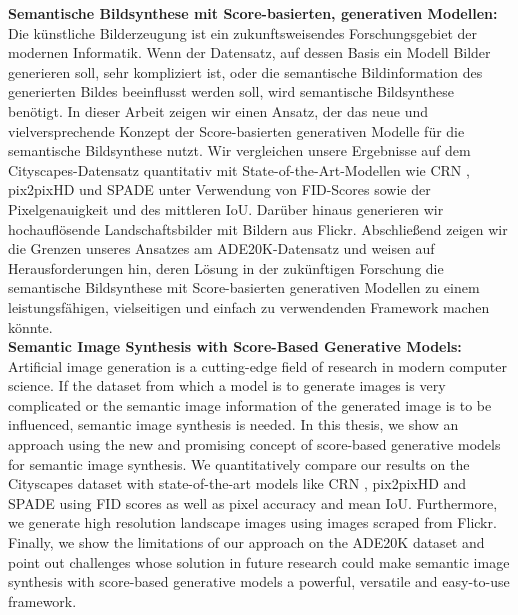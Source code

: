 \noindent\textbf{Semantische Bildsynthese mit Score-basierten, generativen Modellen:}\\[0.3cm]
\noindent Die künstliche Bilderzeugung ist ein zukunftsweisendes Forschungsgebiet der modernen Informatik. Wenn der Datensatz, auf dessen Basis ein Modell Bilder generieren soll, sehr kompliziert ist, oder die semantische Bildinformation des generierten Bildes beeinflusst werden soll, wird semantische Bildsynthese benötigt. In dieser Arbeit zeigen wir einen Ansatz, der das neue und vielversprechende Konzept der Score-basierten generativen Modelle für die semantische Bildsynthese nutzt. Wir vergleichen unsere Ergebnisse auf dem Cityscapes-Datensatz \cite{cityscapes} quantitativ mit State-of-the-Art-Modellen wie CRN \cite{crn}, pix2pixHD \cite{pix2pixHD} und SPADE \cite{spade} unter Verwendung von FID-Scores sowie der Pixelgenauigkeit und des mittleren IoU. Darüber hinaus generieren wir hochauflösende Landschaftsbilder mit Bildern aus Flickr. Abschließend zeigen wir die Grenzen unseres Ansatzes am ADE20K-Datensatz \cite{ade20k} und weisen auf Herausforderungen hin, deren Lösung in der zukünftigen Forschung die semantische Bildsynthese mit Score-basierten generativen Modellen zu einem leistungsfähigen, vielseitigen und einfach zu verwendenden Framework machen könnte.\\[0.3cm]
\noindent\textbf{Semantic Image Synthesis with Score-Based Generative Models:}\\[0.3cm]
\noindent Artificial image generation is a cutting-edge field of research in modern computer science. If the dataset from which a model is to generate images is very complicated or the semantic image information of the generated image is to be influenced, semantic image synthesis is needed. In this thesis, we show an approach using the new and promising concept of score-based generative models for semantic image synthesis. We quantitatively compare our results on the Cityscapes dataset \cite{cityscapes} with state-of-the-art models like CRN \cite{crn}, pix2pixHD \cite{pix2pixHD} and SPADE \cite{spade} using FID scores as well as pixel accuracy and mean IoU. Furthermore, we generate high resolution landscape images using images scraped from Flickr. Finally, we show the limitations of our approach on the ADE20K dataset \cite{ade20k} and point out challenges whose solution in future research could make semantic image synthesis with score-based generative models a powerful, versatile and easy-to-use framework.